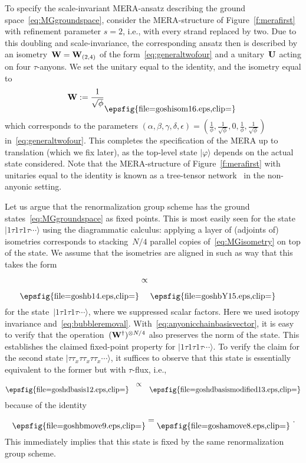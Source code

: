 \documentclass[floats,prb,twocolumn]{revtex4}
\newcommand{\ket}[1]{|#1\rangle}
\newcommand*{\Xisometry}{{\bf W}}
\newcommand*{\Xunitary}{{\bf U}}
\newcommand*{\goshamove}{\raisebox{-7.260pt}{\epsfig{file=goshamove8.eps,clip=}}}
\newcommand*{\goshbmove}{\raisebox{-7.260pt}{\epsfig{file=goshbmove9.eps,clip=}}}
\newcommand*{\goshdbasis}{\raisebox{-7.260pt}{\epsfig{file=goshdbasis12.eps,clip=}}}
\newcommand*{\goshdbasismodified}{\raisebox{-7.260pt}{\epsfig{file=goshdbasismodified13.eps,clip=}}}
\newcommand*{\goshb}{\raisebox{-19.746pt}{\epsfig{file=goshb14.eps,clip=}}}
\newcommand*{\goshbY}{\raisebox{-19.746pt}{\epsfig{file=goshbY15.eps,clip=}}}
\newcommand*{\goshisom}{\raisebox{-14.043pt}{\epsfig{file=goshisom16.eps,clip=}}}
\begin{document}
To specify the scale-invariant MERA-ansatz describing the ground space~\eqref{eq:MGgroundspace}, consider the MERA-structure of  Figure~\ref{f:merafirst} with refinement parameter $s=2$, i.e., with every strand replaced by two. Due to this doubling and scale-invariance, the corresponding ansatz then is described by  an isometry~$\Xisometry=\Xisometry_{(2,4)}$ of the form~\eqref{eq:generaltwofour} and a unitary~$\Xunitary$ acting on four $\tau$-anyons. We set the unitary equal to the identity, and  the isometry equal to
\begin{align}
\Xisometry:=\frac{1}{\sqrt{\phi}}\goshisom\ \label{eq:MGisometry}
\end{align}
which corresponds to  the parameters
$(\alpha,\beta,\gamma,\delta,\epsilon) =(\frac{1}{\phi},\frac{1}{\sqrt{\phi}},0,\frac{1}{\phi},\frac{1}{\sqrt{\phi}})$
in~\eqref{eq:generaltwofour}. This completes the specification of the MERA up to translation (which we fix later), as the top-level state $\ket{\varphi}$ depends on the actual state considered. Note that the MERA-structure of  Figure~\ref{f:merafirst} with unitaries equal to the identity is known as a tree-tensor network~\cite{ShiDuanVidal06,TagliazzoEvenblyVidal09,Murgetaltree10} in the non-anyonic setting.




Let us argue that the renormalization group scheme  has the ground states~\eqref{eq:MGgroundspace} as fixed points.  This is most easily seen  for the state~$\ket{1\tau 1\tau 1\tau\cdots}$ using the diagrammatic calculus: applying a layer of (adjoints of) isometries corresponds to stacking~$N/4$ parallel copies of~\eqref{eq:MGisometry} on top of the state. We assume that the isometries are aligned in such as way that this takes the form
\begin{align*}
\goshb& \propto \goshbY\
\end{align*}
for the state~$\ket{1\tau 1\tau 1\tau\cdots}$, where we suppressed scalar factors. Here we used isotopy invariance and~\eqref{eq:bubbleremoval}.
 With~\eqref{eq:anyonicchainbasisvector}, it is easy to verify that the operation~$(\Xisometry^\dagger)^{\otimes N/4}$ also preserves the norm of the state. This establishes the claimed fixed-point property for $\ket{1\tau 1\tau 1\tau\cdots}$. To verify the claim for the second state $\ket{\tau\tau_x\tau\tau_x\tau\tau_x\cdots}$, it suffices to observe that this state is essentially equivalent to the former but with $\tau$-flux,
i.e.,
\begin{align*}
\goshdbasis\ \  &\propto &\goshdbasismodified
\end{align*}
because of the identity 
\begin{align*}\goshbmove= \goshamove\ .
\end{align*}
This immediately implies that this state is fixed by the same renormalization group scheme.  
\end{document}
